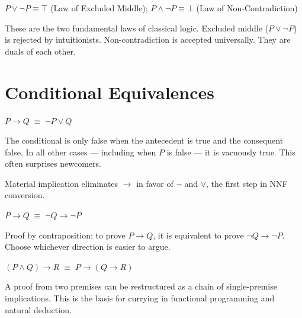 \begin{proposition}\label{eq:negation}
$P \vee \neg P \equiv \top$ \quad (Law of Excluded Middle);\qquad
$P \wedge \neg P \equiv \bot$ \quad (Law of Non-Contradiction)
\end{proposition}
\begin{remark} These are the two fundamental laws of
classical logic. Excluded middle ($P \vee \neg P$) is rejected by intuitionists.
Non-contradiction is accepted universally. They are duals of each other.
\end{remark}

\section*{Conditional Equivalences}

\begin{proposition}\label{eq:mat-impl}
$P \rightarrow Q \;\equiv\; \neg P \vee Q$
\end{proposition}
\begin{remark}[Intuition] The conditional is only false when the antecedent is
true and the consequent false. In all other cases — including when $P$ is false —
it is vacuously true. This often surprises newcomers.
\end{remark}
\begin{remark}[Consequence] Material implication eliminates $\rightarrow$ in
favor of $\neg$ and $\vee$, the first step in NNF conversion.
\end{remark}

\begin{proposition}[Contraposition]\label{eq:contra}
$P \rightarrow Q \;\equiv\; \neg Q \rightarrow \neg P$
\end{proposition}
\begin{remark} Proof by contraposition: to prove $P \rightarrow Q$,
it is equivalent to prove $\neg Q \rightarrow \neg P$. Choose whichever direction
is easier to argue.
\end{remark}

\begin{proposition}\label{eq:export}
$(P \wedge Q) \rightarrow R \;\equiv\; P \rightarrow (Q \rightarrow R)$
\end{proposition}
\begin{remark}[Intuition] A proof from two premises can be restructured as a
chain of single-premise implications. This is the basis for currying in
functional programming and natural deduction.
\end{remark}

